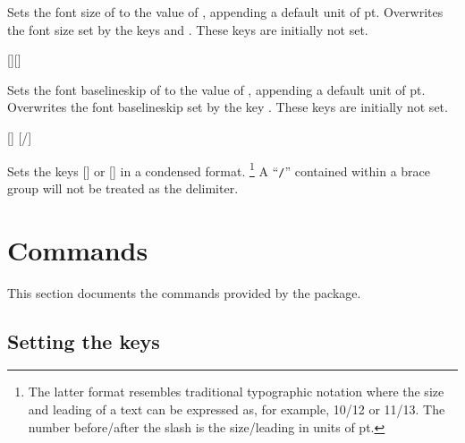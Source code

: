 \documentclass{beery}
\begin{document}
Sets the font size of  to the value of , appending a default unit of \unit{pt}.
Overwrites the font size set by the keys  and .
These keys are initially not set.

\begin{mydisplaycode}
  [][]
\end{mydisplaycode}

Sets the font baselineskip of  to the value of , appending a default unit of \unit{pt}.
Overwrites the font baselineskip set by the key .
These keys are initially not set.

\begin{mydisplaycode}
  []
  \nopagebreak\newline
  [/]
\end{mydisplaycode}

Sets the keys [] or [] in a condensed format.%
\footnote
  {%
    The latter format resembles traditional typographic notation where the size and leading of a text can be expressed as, for example, \num{10}/\num{12} or \num{11}/\num{13}.
    The number before\slash{}after the slash is the size\slash{}leading in units of \unit{pt}.%
  }
A \enquote{\texttt{/}} contained within a brace group will not be treated as the delimiter.


\section{Commands}
\label{sec:commands}

This section documents the commands provided by the  package.

\subsection{Setting the keys}
\label{subsec:fontscalesetup}

\begin{mydisplaycode}
   \sarg{} 
\end{mydisplaycode}
\end{document}
